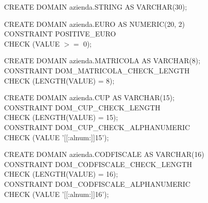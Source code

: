             \begin{flushleft}
                \begin{description}
                    \item CREATE DOMAIN azienda.STRING AS VARCHAR(30);

                    \vspace{0.5cm}
                    
                    \item CREATE DOMAIN azienda.EURO AS NUMERIC(20, 2)\\
                            CONSTRAINT POSITIVE\_EURO\\
	                       CHECK (VALUE \(>=\) 0);

                    \vspace{0.5cm}
                        
                    \item CREATE DOMAIN azienda.MATRICOLA AS VARCHAR(8);\\
                            CONSTRAINT DOM\_MATRICOLA\_CHECK\_LENGTH\\
                                CHECK (LENGTH(VALUE) = 8);

                    \vspace{0.5cm}
                                
                    \item CREATE DOMAIN azienda.CUP AS VARCHAR(15);\\
                            CONSTRAINT DOM\_CUP\_CHECK\_LENGTH\\
                                CHECK (LENGTH(VALUE) = 15);\\
                                CONSTRAINT DOM\_CUP\_CHECK\_ALPHANUMERIC\\
                                CHECK (VALUE \texttildelow '[[:alnum:]]{15}');

                    \vspace{0.5cm}
                                
                    \item CREATE DOMAIN azienda.CODFISCALE AS VARCHAR(16)\\
                            CONSTRAINT DOM\_CODFISCALE\_CHECK\_LENGTH\\
                                CHECK (LENGTH(VALUE) = 16);\\
                            CONSTRAINT DOM\_CODFISCALE\_ALPHANUMERIC\\
                                CHECK (VALUE \texttildelow '[[:alnum:]]{16}');


\end{description}
\end{flushleft}
